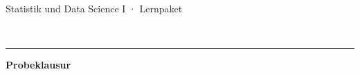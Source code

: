\documentclass[12pt,a4paper]{article}
\begin{document}
\thispagestyle{empty}
\noindent\begin{minipage}[b]{0.25\textwidth}\ \end{minipage}\hfill
\begin{minipage}[b]{0.75\textwidth}\\[1pt]
{\normalsize Statistik und Data Science I · Lernpaket}\end{minipage}\\[-2pt]
\rule{\textwidth}{0.5pt}

\vspace{9mm}
\begin{center}{\LARGE\bfseries Probeklausur}\end{center}
\vspace{8mm}
\end{document}
